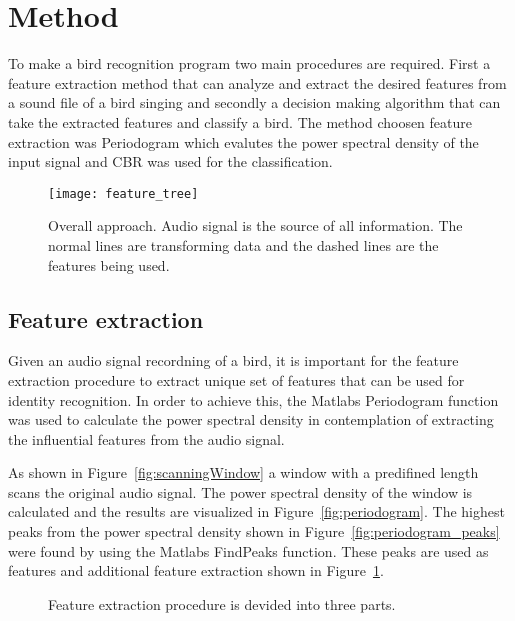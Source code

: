 \section{Method}
To make a bird recognition program two main procedures are required. First a feature
extraction method that can analyze and extract the desired features from a
sound file of a bird singing and secondly a decision making algorithm that can
take the extracted features and classify a bird. The method choosen feature
extraction was Periodogram which evalutes the power spectral density of the
input signal and CBR was used for the classification.

\begin{figure}[h]
\centering
\texttt{[image: feature\_tree]}
\caption{Overall approach. Audio signal is the source of all information. The normal lines are transforming data and the dashed lines are the features being used.}
\label{fig:approach}
\end{figure}

\subsection{Feature extraction}
Given an audio signal recordning of a bird, it is important for the feature extraction
procedure to extract unique set of features that can be used for identity recognition.
In order to achieve this, the Matlabs Periodogram function was used to calculate the power
spectral density in contemplation of extracting the influential features from the audio signal.

As shown in Figure~\ref{fig:scanningWindow} a window with a predifined
length scans the original audio signal. The power spectral density of the window
is calculated and the results are visualized in Figure~\ref{fig:periodogram}.
The highest peaks from the power spectral density shown in Figure~\ref{fig:periodogram_peaks} were found
by using the Matlabs FindPeaks function. These peaks are used as features and additional feature extraction shown in Figure~\ref{fig:approach}.


\begin{figure}[htp]




    \caption{Feature extraction procedure is devided into three parts.}
    \label{fig:featureExtraction}
\end{figure}



